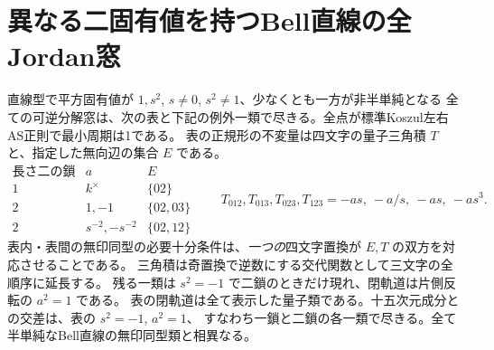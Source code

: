 \section{異なる二固有値を持つBell直線の全Jordan窓}
\label{sec:split-two-eigenvalue-jordan}
\begin{theorem}\label{thm:split-two-eigenvalue-jordan}
直線型で平方固有値が $1,s^2$, $s\ne0$, $s^2\ne1$、少なくとも一方が非半単純となる
全ての可逆分解窓は、次の表と下記の例外一類で尽きる。全点が標準Koszul左右AS正則で最小周期は1である。
表の正規形の不変量は四文字の量子三角積 $T$ と、指定した無向辺の集合 $E$ である。
\[
\begin{array}{c|c|c}
\text{長さ二の鎖} & a & E\\\hline
1 & k^\times & \{02\}\\
2 & 1,-1 & \{02,03\}\\
2 & s^{-2},-s^{-2} & \{02,12\}
\end{array}
\qquad
 T_{012},T_{013},T_{023},T_{123}= -as,\ -a/s,\ -as,\ -as^3 .
\]
表内・表間の無印同型の必要十分条件は、\emph{一つの}四文字置換が $E,T$ の双方を対応させることである。
三角積は奇置換で逆数にする交代関数として三文字の全順序に延長する。
残る一類は $s^2=-1$ で二鎖のときだけ現れ、閉軌道は片側反転の $a^2=1$ である。
表の閉軌道は全て表示した量子類である。十五次元成分との交差は、表の $s^2=-1$, $a^2=1$、
すなわち一鎖と二鎖の各一類で尽きる。全て半単純なBell直線の無印同型類と相異なる。
\end{theorem}
